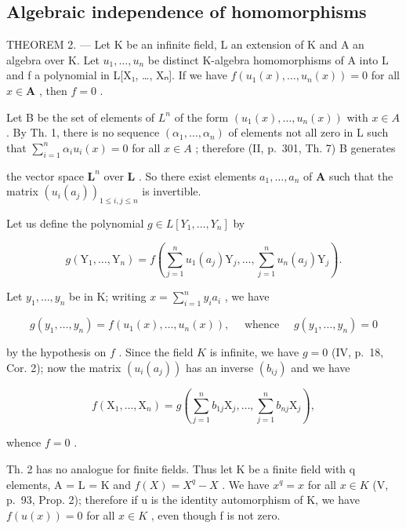 \subsection{Algebraic independence of homomorphisms}

THEOREM 2. --- Let K be an infinite field, L an extension of K and A an algebra over K. Let \(u_1, \ldots, u_n\) be distinct K-algebra homomorphisms of A into L and f a polynomial in L{[}X₁, \ldots, Xₙ{]}. If we have \(f(u_1(x), \ldots, u_n(x)) = 0\) for all \(x \in \mathbf{A}\) , then \(f = 0\) .

Let B be the set of elements of \(L^{n}\) of the form \((u_{1}(x), \ldots, u_{n}(x))\) with \(x \in A\) . By Th. 1, there is no sequence \((\alpha_{1}, \ldots, \alpha_{n})\) of elements not all zero in L such that \(\sum_{i=1}^{n} \alpha_{i} u_{i}(x) = 0\) for all \(x \in A\) ; therefore (II, p.~301, Th. 7) B generates

the vector space \(\mathbf{L}^n\) over \(\mathbf{L}\) . So there exist elements \(a_1, \ldots, a_n\) of \(\mathbf{A}\) such that the matrix \((u_i(a_j))_{1 \leqslant i, j \leqslant n}\) is invertible.

Let us define the polynomial \(g \in L[Y_1, \ldots, Y_n]\) by

\[
g \left(\mathrm{Y} _ {1}, \dots , \mathrm{Y} _ {n}\right) = f \left(\sum_ {j = 1} ^ {n} u _ {1} \left(a _ {j}\right) \mathrm{Y} _ {j}, \dots , \sum_ {j = 1} ^ {n} u _ {n} \left(a _ {j}\right) \mathrm{Y} _ {j}\right).\tag{3}
\]

Let \(y_{1}, \ldots, y_{n}\) be in K; writing \(x = \sum_{i=1}^{n} y_{i} a_{i}\) , we have

\[
g \left(y _ {1}, \dots , y _ {n}\right) = f \left(u _ {1} (x), \dots , u _ {n} (x)\right), \quad \text { whence } \quad g \left(y _ {1}, \dots , y _ {n}\right) = 0
\]

by the hypothesis on \(f\) . Since the field \(K\) is infinite, we have \(g = 0\) (IV, p.~18, Cor. 2); now the matrix \((u_i(a_j))\) has an inverse \((b_{ij})\) and we have

\[
f \left(\mathrm{X} _ {1}, \dots , \mathrm{X} _ {n}\right) = g \left(\sum_ {j = 1} ^ {n} b _ {1 j} \mathrm{X} _ {j}, \dots , \sum_ {j = 1} ^ {n} b _ {n j} \mathrm{X} _ {j}\right),\tag{4}
\]

whence \(f = 0\) .

Th. 2 has no analogue for finite fields. Thus let K be a finite field with q elements, A = L = K and \(f(X) = X^{q} - X\) . We have \(x^{q} = x\) for all \(x \in K\) (V, p.~93, Prop. 2); therefore if u is the identity automorphism of K, we have \(f(u(x)) = 0\) for all \(x \in K\) , even though f is not zero.

